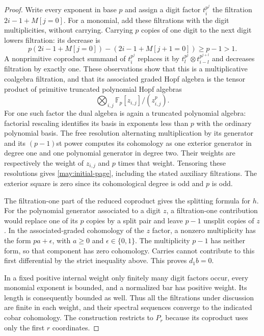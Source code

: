 \begin{proof}
Write every exponent in base $p$ and assign a digit factor $t_i^{p^j}$
the filtration $2i-1+M[j=0]$.  For a monomial, add these filtrations with
the digit multiplicities, without carrying.  Carrying $p$ copies of one
digit to the next digit lowers filtration: its decrease is
\[
 p(2i-1+M[j=0])-(2i-1+M[j+1=0])\geq p-1>1.
\]
A nonprimitive coproduct summand of $t_i^{p^j}$ replaces it by
$t_l^{p^j}\otimes t_{i-l}^{p^{j+l}}$ and decreases filtration by exactly
one.  These observations show that this is a multiplicative coalgebra
filtration, and that its associated graded Hopf algebra is the tensor
product of primitive truncated polynomial Hopf algebras
\[
 \bigotimes_{i,j}\mathbb F_p[z_{i,j}]/(z_{i,j}^p).
\]
For one such factor the dual algebra is again a truncated polynomial
algebra: factorial rescaling identifies its basis in exponents less than
$p$ with the ordinary polynomial basis.  The free resolution alternating
multiplication by its generator and its $(p-1)$st power computes its
cohomology as one exterior generator in degree one and one polynomial
generator in degree two.  Their weights are respectively the weight of
$z_{i,j}$ and $p$ times that weight.  Tensoring these resolutions gives
\eqref{may:initial-page}, including the stated auxiliary filtrations.
The exterior square is zero since its cohomological degree is odd and
$p$ is odd.

The filtration-one part of the reduced coproduct gives the splitting
formula for $h$.  For the polynomial generator associated to a digit
$z$, a filtration-one contribution would replace one of its $p$ copies
by a split pair and leave $p-1$ unsplit copies of $z$.  In the
associated-graded cohomology of the $z$ factor, a nonzero multiplicity
has the form $pa+\epsilon$, with $a\geq0$ and
$\epsilon\in\{0,1\}$.  The multiplicity $p-1$ has neither form, so that
component has zero cohomology.  Carries cannot contribute to this first
differential by the strict inequality above.  This proves $d_1b=0$.

In a fixed positive internal weight only finitely many digit factors
occur, every monomial exponent is bounded, and a normalized bar has
positive weight.  Its length is consequently bounded as well.  Thus all
the filtrations under discussion are finite in each weight, and their
spectral sequences converge to the indicated cobar cohomology.  The
construction restricts to $P_r$ because its coproduct uses only the
first $r$ coordinates.
\end{proof}

